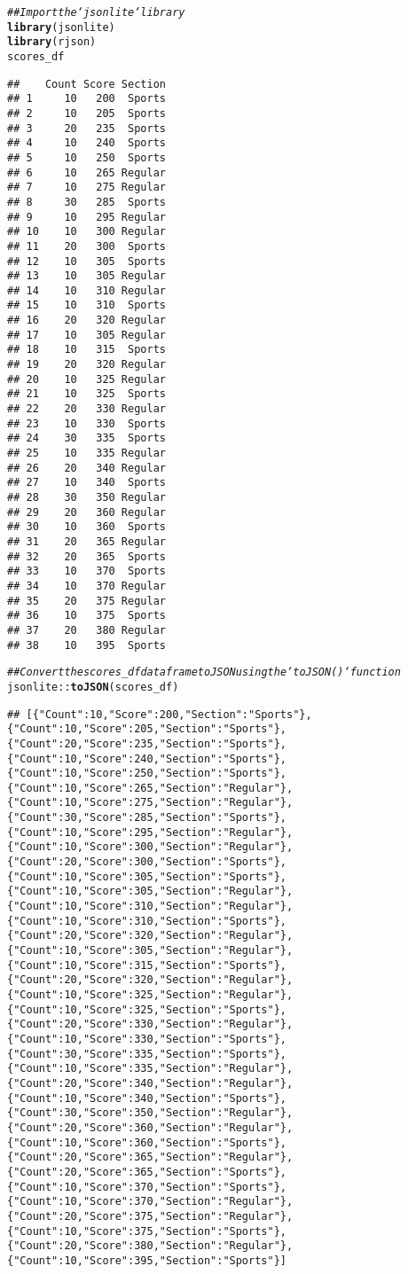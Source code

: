 \documentclass{article}\usepackage[]{graphicx}\usepackage[]{xcolor}
\makeatletter
\newcommand{\hlcom}[1]{\textcolor[rgb]{0.678,0.584,0.686}{\textit{#1}}}%
\newcommand{\hlopt}[1]{\textcolor[rgb]{0,0,0}{#1}}%
\newcommand{\hlstd}[1]{\textcolor[rgb]{0.345,0.345,0.345}{#1}}%
\newcommand{\hlkwd}[1]{\textcolor[rgb]{0.737,0.353,0.396}{\textbf{#1}}}%
\newenvironment{kframe}{%
 \def\at@end@of@kframe{}%
 \ifinner\ifhmode%
  \def\at@end@of@kframe{\end{minipage}}%
  \begin{minipage}{\columnwidth}%
 \fi\fi%
 \def\FrameCommand##1{\hskip\@totalleftmargin \hskip-\fboxsep
 \colorbox{shadecolor}{##1}\hskip-\fboxsep
     \hskip-\linewidth \hskip-\@totalleftmargin \hskip\columnwidth}%
 \MakeFramed {\advance\hsize-\width
   \@totalleftmargin\z@ \linewidth\hsize
   \@setminipage}}%
 {\par\unskip\endMakeFramed%
 \at@end@of@kframe}
\newenvironment{knitrout}{}{} %
\makeatother
\begin{document}
\begin{knitrout}
\begin{kframe}
\begin{alltt}
\hlcom{## Import the `jsonlite` library}
\hlkwd{library}\hlstd{(jsonlite)}
\hlkwd{library}\hlstd{(rjson)}
\hlstd{scores_df}
\end{alltt}
\begin{verbatim}
##    Count Score Section
## 1     10   200  Sports
## 2     10   205  Sports
## 3     20   235  Sports
## 4     10   240  Sports
## 5     10   250  Sports
## 6     10   265 Regular
## 7     10   275 Regular
## 8     30   285  Sports
## 9     10   295 Regular
## 10    10   300 Regular
## 11    20   300  Sports
## 12    10   305  Sports
## 13    10   305 Regular
## 14    10   310 Regular
## 15    10   310  Sports
## 16    20   320 Regular
## 17    10   305 Regular
## 18    10   315  Sports
## 19    20   320 Regular
## 20    10   325 Regular
## 21    10   325  Sports
## 22    20   330 Regular
## 23    10   330  Sports
## 24    30   335  Sports
## 25    10   335 Regular
## 26    20   340 Regular
## 27    10   340  Sports
## 28    30   350 Regular
## 29    20   360 Regular
## 30    10   360  Sports
## 31    20   365 Regular
## 32    20   365  Sports
## 33    10   370  Sports
## 34    10   370 Regular
## 35    20   375 Regular
## 36    10   375  Sports
## 37    20   380 Regular
## 38    10   395  Sports
\end{verbatim}
\begin{alltt}
\hlcom{## Convert the scores_df dataframe to JSON using the `toJSON()` function}
\hlstd{jsonlite}\hlopt{::}\hlkwd{toJSON}\hlstd{(scores_df)}
\end{alltt}
\begin{verbatim}
## [{"Count":10,"Score":200,"Section":"Sports"},{"Count":10,"Score":205,"Section":"Sports"},{"Count":20,"Score":235,"Section":"Sports"},{"Count":10,"Score":240,"Section":"Sports"},{"Count":10,"Score":250,"Section":"Sports"},{"Count":10,"Score":265,"Section":"Regular"},{"Count":10,"Score":275,"Section":"Regular"},{"Count":30,"Score":285,"Section":"Sports"},{"Count":10,"Score":295,"Section":"Regular"},{"Count":10,"Score":300,"Section":"Regular"},{"Count":20,"Score":300,"Section":"Sports"},{"Count":10,"Score":305,"Section":"Sports"},{"Count":10,"Score":305,"Section":"Regular"},{"Count":10,"Score":310,"Section":"Regular"},{"Count":10,"Score":310,"Section":"Sports"},{"Count":20,"Score":320,"Section":"Regular"},{"Count":10,"Score":305,"Section":"Regular"},{"Count":10,"Score":315,"Section":"Sports"},{"Count":20,"Score":320,"Section":"Regular"},{"Count":10,"Score":325,"Section":"Regular"},{"Count":10,"Score":325,"Section":"Sports"},{"Count":20,"Score":330,"Section":"Regular"},{"Count":10,"Score":330,"Section":"Sports"},{"Count":30,"Score":335,"Section":"Sports"},{"Count":10,"Score":335,"Section":"Regular"},{"Count":20,"Score":340,"Section":"Regular"},{"Count":10,"Score":340,"Section":"Sports"},{"Count":30,"Score":350,"Section":"Regular"},{"Count":20,"Score":360,"Section":"Regular"},{"Count":10,"Score":360,"Section":"Sports"},{"Count":20,"Score":365,"Section":"Regular"},{"Count":20,"Score":365,"Section":"Sports"},{"Count":10,"Score":370,"Section":"Sports"},{"Count":10,"Score":370,"Section":"Regular"},{"Count":20,"Score":375,"Section":"Regular"},{"Count":10,"Score":375,"Section":"Sports"},{"Count":20,"Score":380,"Section":"Regular"},{"Count":10,"Score":395,"Section":"Sports"}]

\end{verbatim}
\end{kframe}
\end{knitrout}
\end{document}
